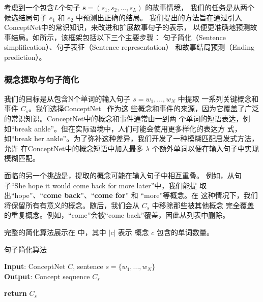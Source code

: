 考虑到一个包含$L$个句子 $\textbf{s} = (s_1, s_2, ..., s_L)$ 的故事情境，
我们的任务是从两个候选结局句子 $e_1$ 和 $e_2$ 中预测出正确的结局。
我们提出的方法旨在通过引入ConceptNet中的常识知识，来改进和扩展故事句子的表示，
以便更准确地预测故事结局。如所示，该框架包括以下三个主要步骤：
句子简化（Sentence simplification）、句子表征（Sentence representation）
和故事结局预测（Ending prediction）。

\subsubsection{概念提取与句子简化}
\label{sec2:sentence_simplification}
我们的目标是从包含N个单词的输入句子 $s = {w_1, ..., w_N}$ 中提取
一系列关键概念和事件 $C_s$。我们选择ConceptNet~\cite{speer2017conceptnet} 作为这
些概念和事件的来源，因为它覆盖了广泛的常识知识。ConceptNet中的概念和事件通常由一到两
个单词的短语表达，例如``break ankle''。但在实际语境中，人们可能会使用更多样化的表达方
式，如``break her ankle''。为了弥补这种差异，我们开发了一种模糊匹配启发式方法，允许
在ConceptNet中的概念短语中加入最多 $\lambda$ 个额外单词以便在输入句子中实现模糊匹配。

面临的另一个挑战是，提取的概念可能在输入句子中相互重叠。
例如，从句子``She hope it would come back for more later''中，我们能提
取出``hope''、``\textbf{come back}''、``\textbf{come for}'' 和 ``more''等概念。在
这种情况下，我们将保留所有有意义的概念。随后，我们会从 $C_s$ 中移除那些被其他概念
完全覆盖的重复概念。例如，``come''会被``come back''覆盖，因此从列表中删除。

完整的简化算法展示在  中，其中 $|c|$ 表示
概念 $c$ 包含的单词数量。

\begin{algorithm}[tb]
    \small
    \caption{句子简化算法}
    \label{alg:simplify}
    \textbf{Input}: ConceptNet $C$, sentence $s=\{w_1, ..., w_N\}$\\
    \textbf{Output}: Concept sequence $C_s$ 
    \begin{algorithmic}[1] %
          \EndIf
        \EndFor
      \EndFor
       \EndIf
      \EndFor 
      \State \textbf{return} {$C_s$ }
      \EndProcedure
    \end{algorithmic}
    \end{algorithm}
    
